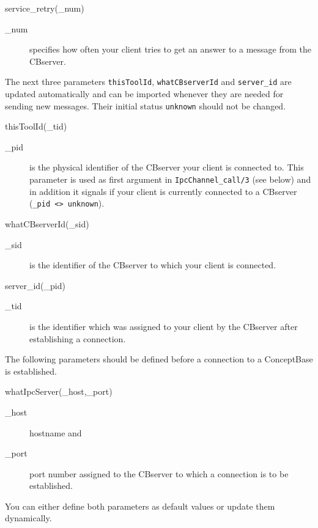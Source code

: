 \begin{method}{service\_retry(\_num)}
  \begin{description}
  \item[\_num] specifies how often your client tries to get an
    answer to a message from the CBserver.
  \end{description}
\end{method}


The next three parameters {\tt thisToolId}, {\tt whatCBserverId}
and {\tt server\_id} are updated automatically and can be imported whenever 
they are needed for sending new messages. Their initial status {\tt unknown}
should not be changed.

\begin{method}{thisToolId(\_tid)}
  \begin{description}
  \item[ \_pid] is the physical identifier of the CBserver your
    client is connected to. This parameter is used as first argument
    in {\tt IpcChannel\_call/3} (see below) and in addition it signals if
    your client is currently connected to a CBserver ({\tt \_pid <> unknown}).
  \end{description}
\end{method}

\begin{method}{whatCBserverId(\_sid)}
  \begin{description}
  \item[ \_sid] is the identifier of the CBserver to which your
    client is connected.
  \end{description}
\end{method}

\begin{method}{server\_id(\_pid)}
  \begin{description}
  \item[\_tid] is the identifier which was assigned to your
    client by the CBserver after establishing a connection.
  \end{description}
\end{method}


The following parameters should be defined before a connection
to a ConceptBase is established.

\begin{method}{whatIpcServer(\_host,\_port)}
  \begin{description}
  \item[\_host] hostname and
  \item[\_port] port number assigned to the CBserver to which a
    connection is to be established. 
  \end{description}
You can either define both parameters as default values or update them 
dynamically.
\end{method}


